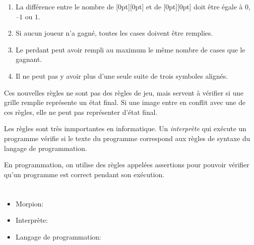 {{\begin{enumerate}
  \item La différence entre le nombre de \raisebox{-0.5ex}[0pt][0pt]{} et de \raisebox{-0.5ex}[0pt][0pt]{} doit être égale à $0$, –$1$ ou $1$.
  \item Si aucun joueur n’a gagné, toutes les cases doivent être remplies.
  \item Le perdant peut avoir rempli au maximum le même nombre de cases que le gagnant.
  \item Il ne peut pas y avoir plus d’une seule suite de trois symboles alignés.
\end{enumerate}

Ces nouvelles règles ne sont pas des règles de jeu, mais servent à vérifier si une grille remplie représente un état final. Si une image entre en conflit avec une de ces règles, elle ne peut pas représenter d’état final.

Les règles sont très inmportantes en informatique. Un \emph{interprète} qui exécute un programme vérifie si le texte du programme correspond aux règles de syntaxe du langage de programmation.

En programmation, on utilise des règles appelées assertions pour pouvoir vérifier qu’un programme est correct pendant son exécution.



\section*{\BrochureWebsitesAndKeywords}
{\raggedright
\begin{itemize}
  \item Morpion: \href{https://fr.wikipedia.org/wiki/Tic-tac-toe}{}
  \item Interprète: \href{https://fr.wikipedia.org/wiki/Interpr\%C3\%A8te_(informatique)}{}
  \item Langage de programmation: \href{https://fr.wikipedia.org/wiki/Langage_de_programmation}{}
\end{itemize}


}}}
